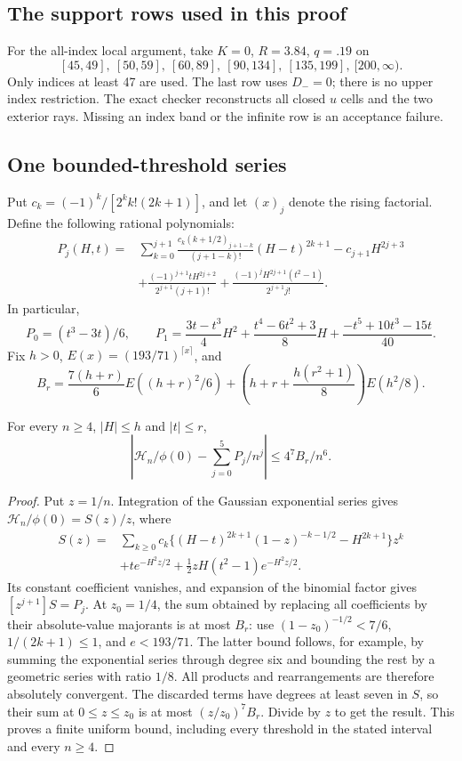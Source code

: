\subsection{The support rows used in this proof}
For the all-index local argument, take $K=0$, $R=3.84$, $q=.19$ on
\[
[45,49],\ [50,59],\ [60,89],\ [90,134],\ [135,199],\ [200,\infty).
\]
Only indices at least 47 are used. The last row uses $D_-=0$;
there is no upper index restriction. The exact checker reconstructs
all closed $u$ cells and the two exterior rays. Missing an index band
or the infinite row is an acceptance failure.

\subsection{One bounded-threshold series}\label{support:series}
Put $c_k=(-1)^k/[2^kk!(2k+1)]$, and let $(x)_j$ denote the rising
factorial. Define the following rational polynomials:
\begin{align*}
 P_j(H,t)={}&\sum_{k=0}^{j+1}
 \frac{c_k(k+1/2)_{j+1-k}}{(j+1-k)!}(H-t)^{2k+1}
       -c_{j+1}H^{2j+3}\\
 &+\frac{(-1)^{j+1}tH^{2j+2}}{2^{j+1}(j+1)!}
       +\frac{(-1)^jH^{2j+1}(t^2-1)}{2^{j+1}j!}.
\end{align*}
In particular,
\[
 P_0=(t^3-3t)/6,\qquad
 P_1=\frac{3t-t^3}{4}H^2+\frac{t^4-6t^2+3}{8}H
                  +\frac{-t^5+10t^3-15t}{40}.
\]
Fix $h>0$, $E(x)=(193/71)^{\lceil x\rceil}$, and
\[
 B_r=\frac{7(h+r)}6E((h+r)^2/6)
       +\left(h+r+\frac{h(r^2+1)}8\right)E(h^2/8).
\]
\begin{lemma}\label{support:finite-series}
For every $n\ge4$, $|H|\le h$ and $|t|\le r$,
\[
 \left|\mathcal H_n/\phi(0)-\sum_{j=0}^5P_j/n^j\right|
       \le4^7B_r/n^6.
\]
\end{lemma}
\begin{proof}
Put $z=1/n$. Integration of the Gaussian exponential series gives
$\mathcal H_n/\phi(0)=S(z)/z$, where
\begin{align*}
 S(z)={}&\sum_{k\ge0}c_k\{(H-t)^{2k+1}(1-z)^{-k-1/2}
                                  -H^{2k+1}\}z^k\\
 &+te^{-H^2z/2}+\tfrac12zH(t^2-1)e^{-H^2z/2}.
\end{align*}
Its constant coefficient vanishes, and expansion of the binomial factor
gives $[z^{j+1}]S=P_j$. At $z_0=1/4$, the sum obtained by replacing
all coefficients by their absolute-value majorants is at most $B_r$:
use $(1-z_0)^{-1/2}<7/6$, $1/(2k+1)\le1$, and $e<193/71$.
The latter bound follows, for example, by summing the exponential series
through degree six and bounding the rest by a geometric series with
ratio $1/8$. All products and rearrangements are therefore absolutely
convergent. The discarded terms have degrees at least seven in $S$,
so their sum at $0\le z\le z_0$ is at most $(z/z_0)^7B_r$.
Divide by $z$ to get the result. This proves a finite uniform bound,
including every threshold in the stated interval and every $n\ge4$.
\end{proof}

